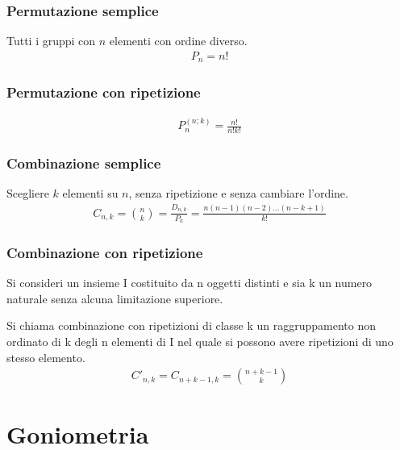 \documentclass[a4paper]{article}
\begin{document}
	\subsubsection{Permutazione semplice}
	Tutti i gruppi con $n$ elementi con ordine diverso.
	\begin{align*}
		P_n = n! 
	\end{align*}
	
	\subsubsection{Permutazione con ripetizione}
	\begin{align*}
		P_n^{(n;k)}=\frac{n!}{n!k!}
	\end{align*}
	
	\subsubsection{Combinazione semplice}
	Scegliere $k$ elementi su $n$, senza ripetizione e senza cambiare l'ordine.
	\begin{align*}
		C_{n,k} = {{n}\choose{k}} = \frac{D_{n,k}}{P_k} = \frac{n(n-1)(n-2)...(n-k+1)}{k!} 
	\end{align*}
	
	\subsubsection{Combinazione con ripetizione}
	Si consideri un insieme I costituito da n oggetti distinti e sia k un numero naturale senza alcuna limitazione superiore.
	
	Si chiama combinazione con ripetizioni di classe k un raggruppamento non ordinato di k degli n elementi di I nel quale si possono avere ripetizioni di uno stesso elemento.\\
	\begin{align*}
		C'_{n,k} = C_{n+k-1 , k} = {{n+k-1}\choose{k}}
	\end{align*}
	
	\newpage
	\section{Goniometria}
		
\end{document}
